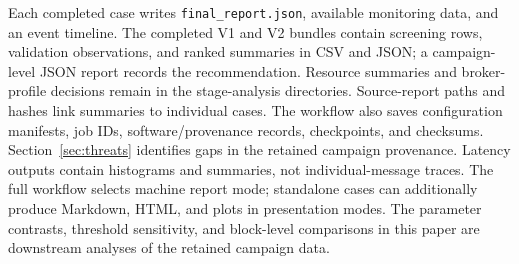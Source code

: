 \documentclass[10pt]{article}
\begin{document}
Each completed case writes \texttt{final\_report.json}, available monitoring data, and an
event timeline.  The completed V1 and V2 bundles contain screening rows,
validation observations, and ranked summaries in CSV and JSON; a campaign-level JSON
report records the recommendation.  Resource summaries and broker-profile
decisions remain in the stage-analysis directories.  Source-report paths and
hashes link summaries to individual cases.  The workflow also saves configuration
manifests, job IDs, software/provenance records, checkpoints, and checksums.
Section~\ref{sec:threats} identifies gaps in the retained campaign provenance.
Latency outputs contain histograms and summaries, not individual-message traces.
The full workflow selects machine report mode; standalone cases can additionally
produce Markdown, HTML, and plots in presentation modes.
The parameter contrasts, threshold sensitivity, and block-level comparisons in
this paper are downstream analyses of the retained campaign data.
\end{document}
